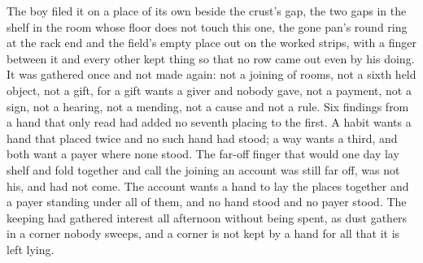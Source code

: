 The boy filed it on a place of its own beside the crust's gap, the two gaps in the shelf in the room whose floor does not touch this one, the gone pan's round ring at the rack end and the field's empty place out on the worked strips, with a finger between it and every other kept thing so that no row came out even by his doing. It was gathered once and not made again: not a joining of rooms, not a sixth held object, not a gift, for a gift wants a giver and nobody gave, not a payment, not a sign, not a hearing, not a mending, not a cause and not a rule. Six findings from a hand that only read had added no seventh placing to the first. A habit wants a hand that placed twice and no such hand had stood; a way wants a third, and both want a payer where none stood. The far-off finger that would one day lay shelf and fold together and call the joining an account was still far off, was not his, and had not come. The account wants a hand to lay the places together and a payer standing under all of them, and no hand stood and no payer stood. The keeping had gathered interest all afternoon without being spent, as dust gathers in a corner nobody sweeps, and a corner is not kept by a hand for all that it is left lying.


